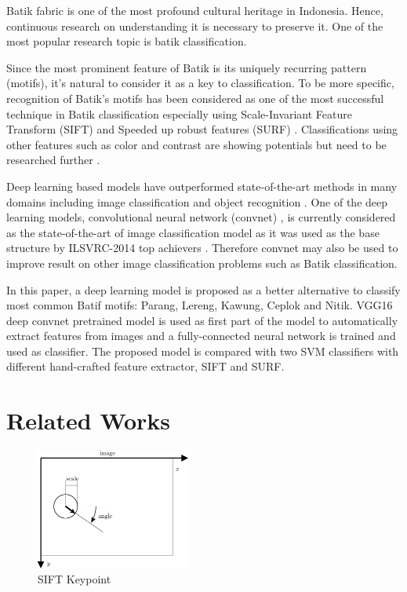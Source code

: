 \documentclass[conference]{IEEEtran}
\begin{document}
Batik fabric is one of the most profound cultural heritage in Indonesia. Hence, continuous research on understanding it is necessary to preserve it. One of the most popular research topic is batik classification.

Since the most prominent feature of Batik is its uniquely recurring pattern (motifs), it's natural to consider it as a key to classification. To be more specific, recognition of Batik's motifs has been considered as one of the most successful technique in Batik classification especially using Scale-Invariant Feature Transform (SIFT) \cite{azhar2015batik} \cite{nurhaida2015automatic} and Speeded up robust features (SURF) \cite{willy2013evaluation}. Classifications using other features such as color and contrast are showing potentials but need to be researched further \cite{moertini2005algorithms}.

Deep learning based models have outperformed state-of-the-art methods in many domains including image classification and object recognition \cite{lecun2015deep}. One of the deep learning models, convolutional neural network (convnet) \cite{lecun1998gradient}, is currently considered as the state-of-the-art of image classification model as it was used as the base structure by ILSVRC-2014 top achievers \cite{simonyan2014very}. Therefore convnet may also be used to improve result on other image classification problems such as Batik classification.

In this paper, a deep learning model is proposed as a better alternative to classify most common Batif motifs: Parang, Lereng, Kawung, Ceplok and Nitik. VGG16 deep convnet pretrained model \cite{simonyan2014very} is used as first part of the model to automatically extract features from images and a fully-connected neural network is trained and used as classifier. The proposed model is compared with two SVM classifiers with different hand-crafted feature extractor, SIFT and SURF.

\section{Related Works}

\begin{figure}[!b]
\centering
\includegraphics[width=2.0in]{sift-keypoint}
\caption{SIFT Keypoint}
\label{fig_keypoint}
\end{figure}
\end{document}
